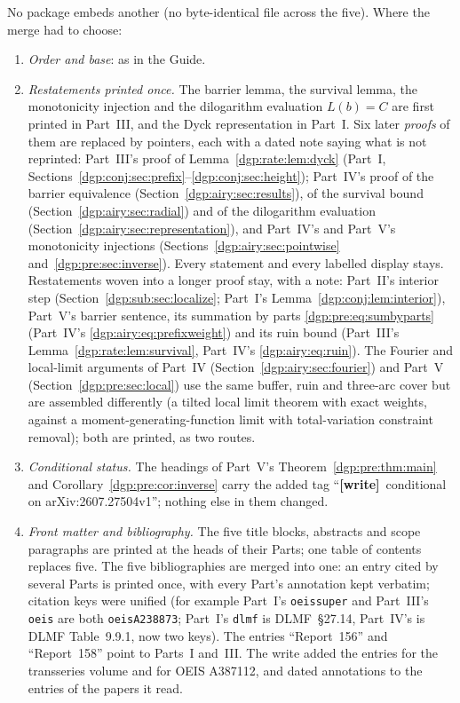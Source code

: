 \documentclass[11pt,letterpaper]{article}
\numberwithin{equation}{section}
\theoremstyle{remark}\newtheorem{remark}[theorem]{Remark}
\newcommand{\wtag}{\textup{\textbf{[write]}}}
\begin{document}
No package embeds another (no byte-identical file across the five). Where the merge had to choose:
\begin{enumerate}
\item \emph{Order and base}: as in the Guide.
\item \emph{Restatements printed once.} The barrier lemma, the survival lemma, the monotonicity injection and the dilogarithm evaluation $L(b)=C$ are first printed in Part~III, and the Dyck representation in Part~I. Six later \emph{proofs} of them are replaced by pointers, each with a dated note saying what is not reprinted: Part~III's proof of Lemma~\ref{dgp:rate:lem:dyck} (Part~I, Sections~\ref{dgp:conj:sec:prefix}--\ref{dgp:conj:sec:height}); Part~IV's proof of the barrier equivalence (Section~\ref{dgp:airy:sec:results}), of the survival bound (Section~\ref{dgp:airy:sec:radial}) and of the dilogarithm evaluation (Section~\ref{dgp:airy:sec:representation}), and Part~IV's and Part~V's monotonicity injections (Sections~\ref{dgp:airy:sec:pointwise} and~\ref{dgp:pre:sec:inverse}). Every statement and every labelled display stays. Restatements woven into a longer proof stay, with a note: Part~II's interior step (Section~\ref{dgp:sub:sec:localize}; Part~I's Lemma~\ref{dgp:conj:lem:interior}), Part~V's barrier sentence, its summation by parts \eqref{dgp:pre:eq:sumbyparts} (Part~IV's \eqref{dgp:airy:eq:prefixweight}) and its ruin bound (Part~III's Lemma~\ref{dgp:rate:lem:survival}, Part~IV's \eqref{dgp:airy:eq:ruin}). The Fourier and local-limit arguments of Part~IV (Section~\ref{dgp:airy:sec:fourier}) and Part~V (Section~\ref{dgp:pre:sec:local}) use the same buffer, ruin and three-arc cover but are assembled differently (a tilted local limit theorem with exact weights, against a moment-generating-function limit with total-variation constraint removal); both are printed, as two routes.
\item \emph{Conditional status.} The headings of Part~V's Theorem~\ref{dgp:pre:thm:main} and Corollary~\ref{dgp:pre:cor:inverse} carry the added tag ``\wtag\ conditional on arXiv:2607.27504v1''; nothing else in them changed.
\item \emph{Front matter and bibliography.} The five title blocks, abstracts and scope paragraphs are printed at the heads of their Parts; one table of contents replaces five. The five bibliographies are merged into one: an entry cited by several Parts is printed once, with every Part's annotation kept verbatim; citation keys were unified (for example Part~I's \texttt{oeissuper} and Part~III's \texttt{oeis} are both \texttt{oeisA238873}; Part~I's \texttt{dlmf} is DLMF~\S27.14, Part~IV's is DLMF Table~9.9.1, now two keys). The entries ``Report~156'' and ``Report~158'' point to Parts~I and~III. The write added the entries for the transseries volume and for OEIS A387112, and dated annotations to the entries of the papers it read.

\end{enumerate}
\end{document}
